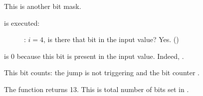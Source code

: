 This is another bit mask.

\clearpage
\AND is executed:

\begin{figure}[H]
\centering
{}
\caption{\olly: $i=4$, 
is there that bit in the input value? Yes. ()}
\label{fig:shifts_olly4_3}
\end{figure}

\ZF is 0 because this bit is present in the input value.
Indeed, . 

This bit counts: the jump is not triggering and the bit counter 
.

The function returns 13. 
This is total number of bits set in .

